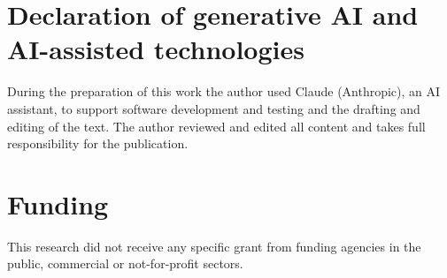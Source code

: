 \documentclass[11pt,a4paper]{article}
\begin{document}
\section*{Declaration of generative AI and AI-assisted technologies}
During the preparation of this work the author used Claude (Anthropic), an AI assistant, to support software development and testing and the drafting and editing of the text. The author reviewed and edited all content and takes full responsibility for the publication.

\section*{Funding}
This research did not receive any specific grant from funding agencies in the public, commercial or not-for-profit sectors.



\end{document}
